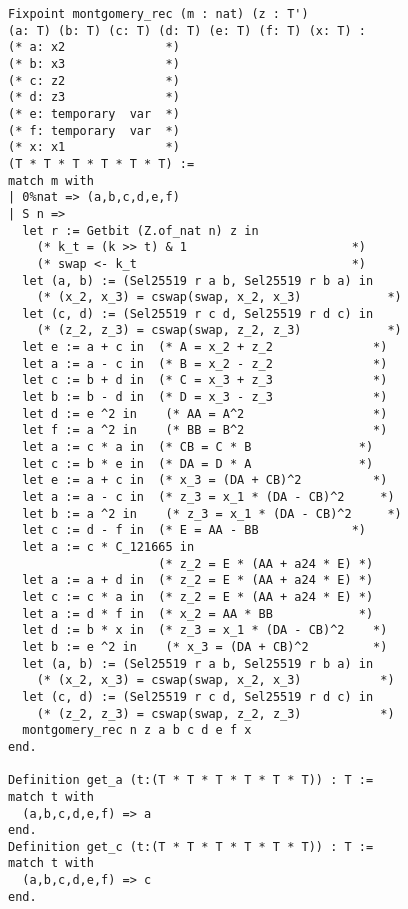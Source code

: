 \begin{lstlisting}[language=Coq]
Fixpoint montgomery_rec (m : nat) (z : T')
(a: T) (b: T) (c: T) (d: T) (e: T) (f: T) (x: T) :
(* a: x2              *)
(* b: x3              *)
(* c: z2              *)
(* d: z3              *)
(* e: temporary  var  *)
(* f: temporary  var  *)
(* x: x1              *)
(T * T * T * T * T * T) :=
match m with
| 0%nat => (a,b,c,d,e,f)
| S n =>
  let r := Getbit (Z.of_nat n) z in
    (* k_t = (k >> t) & 1                       *)
    (* swap <- k_t                              *)
  let (a, b) := (Sel25519 r a b, Sel25519 r b a) in
    (* (x_2, x_3) = cswap(swap, x_2, x_3)            *)
  let (c, d) := (Sel25519 r c d, Sel25519 r d c) in
    (* (z_2, z_3) = cswap(swap, z_2, z_3)            *)
  let e := a + c in  (* A = x_2 + z_2              *)
  let a := a - c in  (* B = x_2 - z_2              *)
  let c := b + d in  (* C = x_3 + z_3              *)
  let b := b - d in  (* D = x_3 - z_3              *)
  let d := e ^2 in    (* AA = A^2                  *)
  let f := a ^2 in    (* BB = B^2                  *)
  let a := c * a in  (* CB = C * B               *)
  let c := b * e in  (* DA = D * A               *)
  let e := a + c in  (* x_3 = (DA + CB)^2          *)
  let a := a - c in  (* z_3 = x_1 * (DA - CB)^2     *)
  let b := a ^2 in    (* z_3 = x_1 * (DA - CB)^2     *)
  let c := d - f in  (* E = AA - BB             *)
  let a := c * C_121665 in
                     (* z_2 = E * (AA + a24 * E) *)
  let a := a + d in  (* z_2 = E * (AA + a24 * E) *)
  let c := c * a in  (* z_2 = E * (AA + a24 * E) *)
  let a := d * f in  (* x_2 = AA * BB            *)
  let d := b * x in  (* z_3 = x_1 * (DA - CB)^2    *)
  let b := e ^2 in    (* x_3 = (DA + CB)^2         *)
  let (a, b) := (Sel25519 r a b, Sel25519 r b a) in
    (* (x_2, x_3) = cswap(swap, x_2, x_3)           *)
  let (c, d) := (Sel25519 r c d, Sel25519 r d c) in
    (* (z_2, z_3) = cswap(swap, z_2, z_3)           *)
  montgomery_rec n z a b c d e f x
end.

Definition get_a (t:(T * T * T * T * T * T)) : T :=
match t with
  (a,b,c,d,e,f) => a
end.
Definition get_c (t:(T * T * T * T * T * T)) : T :=
match t with
  (a,b,c,d,e,f) => c
end.
\end{lstlisting}

